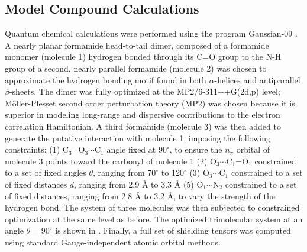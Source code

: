 \subsection{Model Compound Calculations}

\begin{doublespace}
Quantum chemical calculations were performed using the program Gaussian-09
\cite{gaussian2009}. A nearly planar formamide head-to-tail dimer,
composed of a formamide monomer (molecule 1) hydrogen bonded through its C=O
group to the N-H group of a second, nearly parallel formamide (molecule 2) was
chosen to approximate the hydrogen bonding motif found in both $\alpha$-helices
and antiparallel $\beta$-sheets. The dimer was fully optimized at the
MP2/6-311++G(2d,p) level; M\"{o}ller-Plesset second order perturbation theory
(MP2) was chosen because it is superior in modeling long-range and dispersive
contributions to the electron correlation Hamiltonian. A third formamide
(molecule 3) was then added to generate the putative \npistar{} interaction
with molecule 1, imposing the following constraints:
(1) C$_3$=O$_3\cdots$C$_1$ angle fixed at 90$^\circ$, to ensure the $n_\pi$
orbital of molecule 3 points toward the carbonyl of molecule
1 (2) O$_3\cdots$C$_1$=O$_1$ constrained to a set of fixed angles $\theta$,
ranging from 70$^\circ$ to 120$^\circ$ (3) O$_3\cdots$C$_1$ constrained to
a set of fixed distances $d$, ranging from 2.9 \r{A} to 3.3 \r{A}
(5) O$_1\cdots$N$_2$ constrained to a set of fixed distances, ranging
from 2.8 \r{A} to 3.2 \r{A}, to vary the strength of the hydrogen bond. The
system of three molecules was then subjected to constrained optimization at the
same level as before. The optimized trimolecular system at an angle
$\theta = 90^\circ$ is shown in . Finally, a full
set of shielding tensors was computed using standard Gauge-independent
atomic orbital methods.
\end{doublespace}

